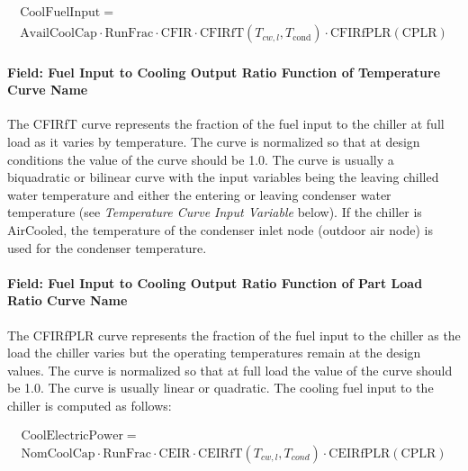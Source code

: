 \begin{equation}
    \begin{array}{l}
        \mathrm{CoolFuelInput} = \\
        \mathrm{AvailCoolCap} \cdot \mathrm{RunFrac} \cdot \mathrm{CFIR} \cdot \mathrm{CFIRfT}( T_{cw,l}, {T_{\mathrm{cond}}}) \cdot \mathrm{CFIRfPLR}( \mathrm{CPLR} )
    \end{array}
\end{equation}

\paragraph{Field: Fuel Input to Cooling Output Ratio Function of Temperature Curve Name}\label{field-fuel-input-to-cooling-output-ratio-function-of-temperature-curve-name}

The CFIRfT curve represents the fraction of the fuel input to the chiller at full load as it varies by temperature. The curve is normalized so that at design conditions the value of the curve should be 1.0. The curve is usually a biquadratic or bilinear curve with the input variables being the leaving chilled water temperature and either the entering or leaving condenser water temperature (see \emph{Temperature Curve Input Variable} below). If the chiller is AirCooled, the temperature of the condenser inlet node (outdoor air node) is used for the condenser temperature.

\paragraph{Field: Fuel Input to Cooling Output Ratio Function of Part Load Ratio Curve Name}\label{field-fuel-input-to-cooling-output-ratio-function-of-part-load-ratio-curve-name}

The CFIRfPLR curve represents the fraction of the fuel input to the chiller as the load the chiller varies but the operating temperatures remain at the design values. The curve is normalized so that at full load the value of the curve should be 1.0. The curve is usually linear or quadratic. The cooling fuel input to the chiller is computed as follows:

\begin{equation}
    \begin{array}{l}
        \mathrm{CoolElectricPower} = \\
        \mathrm{NomCoolCap} \cdot \mathrm{RunFrac} \cdot \mathrm{CEIR} \cdot \mathrm{CEIRfT}(T_{cw,l}, T_{cond}) \cdot \mathrm{CEIRfPLR}(\mathrm{CPLR})
    \end{array}
\end{equation}

